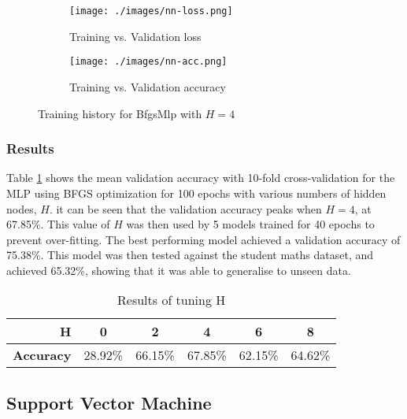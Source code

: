 \documentclass[12pt,a4paper,titlepage,twoside]{report}
\begin{document}
	\begin{figure}[h]
		\centering
		\begin{subfigure}{0.5\textwidth}
	  		\centering
  			\texttt{[image: ./images/nn-loss.png]}
  			\caption{Training vs. Validation loss}
  			\label{fig:nn-loss}
		\end{subfigure}%
		\begin{subfigure}{0.5\textwidth}
  			\centering
	  		\texttt{[image: ./images/nn-acc.png]}
  			\caption{Training vs. Validation accuracy}
 			\label{fig:nn-acc}
		\end{subfigure}
		\caption[LLL]%
		{Training history for BfgsMlp with $H = 4$\footnotemark}
		\label{fig:nn-loss-acc}
	\end{figure}

\subsubsection*{Results}
	Table \ref{tab:bfgs-results} shows the mean validation accuracy with 10-fold cross-validation for the MLP using BFGS optimization for 100 epochs with various numbers of hidden nodes, $H$. it can be seen that the validation accuracy peaks when $H = 4$, at 67.85\%. This value of $H$ was then used by 5 models trained for 40 epochs to prevent over-fitting. The best performing model achieved a validation accuracy of 75.38\%. This model was then tested against the student maths dataset, and achieved 65.32\%, showing that it was able to generalise to unseen data.
	
	\begin{table}[h]
		\centering
		\begin{tabular}{|r| c c c c c|}
			\hline
			\textbf{H}	& 0 & 2 & 4 & 6 & 8 \\ \hline
			\textbf{Accuracy} & 28.92\% & 66.15\% & 67.85\% & 62.15\% & 64.62\%  \\ \hline
		\end{tabular}
		\caption{Results of tuning H}
		\label{tab:bfgs-results}
	\end{table}
	

\subsection{Support Vector Machine}
\end{document}
